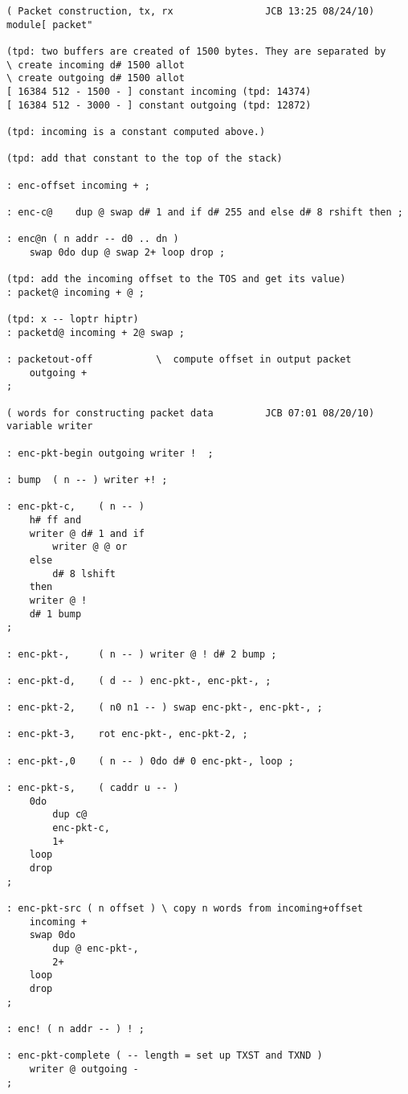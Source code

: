 \begin{verbatim}
( Packet construction, tx, rx                JCB 13:25 08/24/10)
module[ packet"

(tpd: two buffers are created of 1500 bytes. They are separated by
\ create incoming d# 1500 allot
\ create outgoing d# 1500 allot
[ 16384 512 - 1500 - ] constant incoming (tpd: 14374)
[ 16384 512 - 3000 - ] constant outgoing (tpd: 12872)

(tpd: incoming is a constant computed above.)

(tpd: add that constant to the top of the stack)

: enc-offset incoming + ;

: enc-c@    dup @ swap d# 1 and if d# 255 and else d# 8 rshift then ;

: enc@n ( n addr -- d0 .. dn )
    swap 0do dup @ swap 2+ loop drop ; 

(tpd: add the incoming offset to the TOS and get its value)
: packet@ incoming + @ ;

(tpd: x -- loptr hiptr)
: packetd@ incoming + 2@ swap ;

: packetout-off           \  compute offset in output packet
    outgoing +
;

( words for constructing packet data         JCB 07:01 08/20/10)
variable writer

: enc-pkt-begin outgoing writer !  ;

: bump  ( n -- ) writer +! ;

: enc-pkt-c,    ( n -- )
    h# ff and
    writer @ d# 1 and if 
        writer @ @ or 
    else
        d# 8 lshift
    then
    writer @ !
    d# 1 bump
;

: enc-pkt-,     ( n -- ) writer @ ! d# 2 bump ;

: enc-pkt-d,    ( d -- ) enc-pkt-, enc-pkt-, ;

: enc-pkt-2,    ( n0 n1 -- ) swap enc-pkt-, enc-pkt-, ;

: enc-pkt-3,    rot enc-pkt-, enc-pkt-2, ;

: enc-pkt-,0    ( n -- ) 0do d# 0 enc-pkt-, loop ;

: enc-pkt-s,    ( caddr u -- )
    0do
        dup c@
        enc-pkt-c,
        1+
    loop
    drop
;

: enc-pkt-src ( n offset ) \ copy n words from incoming+offset
    incoming +
    swap 0do
        dup @ enc-pkt-,
        2+
    loop
    drop
;

: enc! ( n addr -- ) ! ;

: enc-pkt-complete ( -- length = set up TXST and TXND )
    writer @ outgoing -
;


\end{verbatim}
